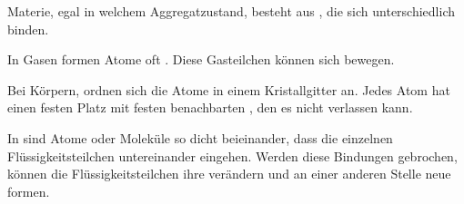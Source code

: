 
\StartLueckentext

Materie, egal in welchem Aggregatzustand, besteht aus , die sich unterschiedlich binden.

In Gasen formen Atome oft . Diese Gasteilchen können sich  bewegen.

Bei  Körpern, ordnen sich die Atome in einem Kristallgitter an.
Jedes Atom hat einen festen Platz mit festen benachbarten , den es nicht verlassen kann.

In  sind Atome oder Moleküle so dicht beieinander, dass die einzelnen Flüssigkeitsteilchen  untereinander eingehen.
Werden diese  Bindungen gebrochen, 
können die Flüssigkeitsteilchen ihre  verändern und an einer anderen Stelle neue  formen.

\StoppLueckentext

